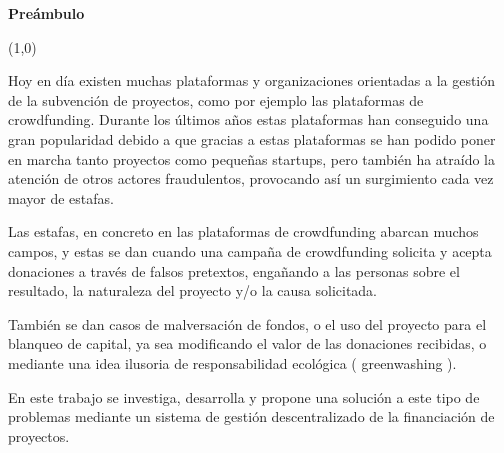 \thispagestyle{empty}
{\Huge{ \textbf{ Preámbulo }}}

\begin{center}
\line(1,0){\textwidth}
\end{center}

Hoy en día existen muchas plataformas y organizaciones orientadas a la gestión de la subvención de proyectos, como por ejemplo las plataformas de crowdfunding. Durante los últimos años estas plataformas han conseguido una gran popularidad debido a que gracias a estas plataformas se han podido poner en marcha tanto proyectos como pequeñas startups, pero también ha atraído la atención de otros actores fraudulentos, provocando así un surgimiento cada vez mayor de estafas.

\bigskip

Las estafas, en concreto en las plataformas de crowdfunding abarcan muchos campos, y estas se dan cuando una campaña de crowdfunding solicita y acepta donaciones a través de falsos pretextos, engañando a las personas sobre el resultado, la naturaleza del proyecto y/o la causa solicitada.

\bigskip

También se dan casos de malversación de fondos, o el uso del proyecto para el blanqueo de capital, ya sea modificando el valor de las donaciones recibidas, o mediante una idea ilusoria de responsabilidad ecológica ( greenwashing ).

\bigskip

En este trabajo se investiga, desarrolla y propone una solución a este tipo de problemas mediante un sistema de gestión descentralizado de la financiación de proyectos.
